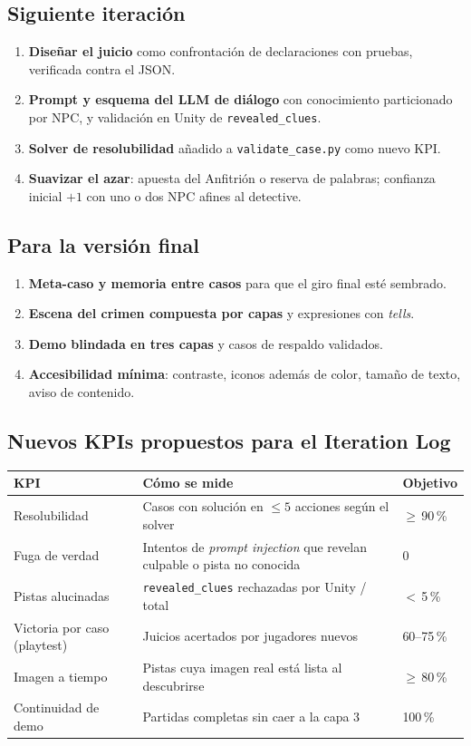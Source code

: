 \documentclass[11pt,a4paper]{article}
\newcommand{\file}[1]{\texttt{\small #1}}
\begin{document}
\subsection*{Siguiente iteración}
\begin{enumerate}[resume]
\item \textbf{Diseñar el juicio} como confrontación de declaraciones con pruebas, verificada contra
el JSON.
\item \textbf{Prompt y esquema del LLM de diálogo} con conocimiento particionado por NPC, y
validación en Unity de \texttt{revealed\_clues}.
\item \textbf{Solver de resolubilidad} añadido a \file{validate\_case.py} como nuevo KPI.
\item \textbf{Suavizar el azar}: apuesta del Anfitrión o reserva de palabras; confianza inicial $+1$
con uno o dos NPC afines al detective.
\end{enumerate}

\subsection*{Para la versión final}
\begin{enumerate}[resume]
\item \textbf{Meta-caso y memoria entre casos} para que el giro final esté sembrado.
\item \textbf{Escena del crimen compuesta por capas} y expresiones con \emph{tells}.
\item \textbf{Demo blindada en tres capas} y casos de respaldo validados.
\item \textbf{Accesibilidad mínima}: contraste, iconos además de color, tamaño de texto, aviso de
contenido.
\end{enumerate}

\subsection*{Nuevos KPIs propuestos para el Iteration Log}
\begin{center}
\renewcommand{\arraystretch}{1.2}
\begin{tabularx}{\linewidth}{l X l}
\toprule
\textbf{KPI} & \textbf{Cómo se mide} & \textbf{Objetivo} \\
\midrule
Resolubilidad & Casos con solución en $\leq 5$ acciones según el solver & $\geq$\,90\,\% \\
Fuga de verdad & Intentos de \emph{prompt injection} que revelan culpable o pista no conocida & 0 \\
Pistas alucinadas & \texttt{revealed\_clues} rechazadas por Unity / total & $<$\,5\,\% \\
Victoria por caso (playtest) & Juicios acertados por jugadores nuevos & 60--75\,\% \\
Imagen a tiempo & Pistas cuya imagen real está lista al descubrirse & $\geq$\,80\,\% \\
Continuidad de demo & Partidas completas sin caer a la capa 3 & 100\,\% \\
\bottomrule
\end{tabularx}
\end{center}
\end{document}
